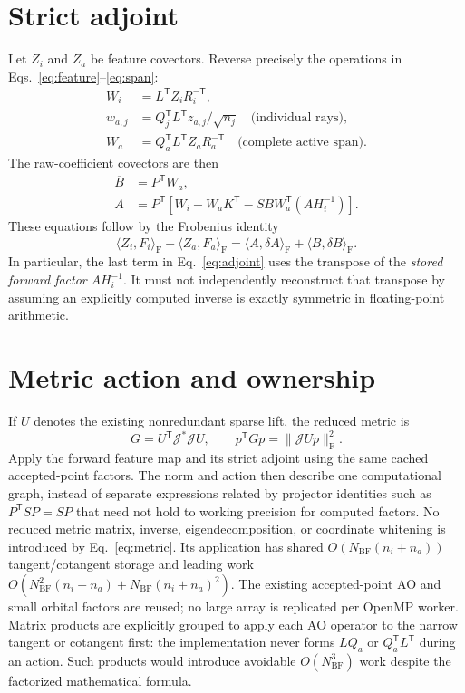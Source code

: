 \documentclass[11pt,a4paper]{article}
\newcommand{\Tr}{^{\mathsf T}}
\newcommand{\ip}[2]{\langle #1,#2\rangle_{\mathrm F}}
\begin{document}
\section{Strict adjoint}
Let $Z_i$ and $Z_a$ be feature covectors. Reverse precisely the operations in
Eqs.~\eqref{eq:feature}--\eqref{eq:span}:
\begin{align}
 W_i&=L\Tr Z_iR_i^{-\mathsf T},\\
 w_{a,j}&=Q_j\Tr L\Tr z_{a,j}/\sqrt{n_j}
 \quad\text{(individual rays)},\\
 W_a&=Q_a\Tr L\Tr Z_aR_a^{-\mathsf T}
 \quad\text{(complete active span)}.
\end{align}
The raw-coefficient covectors are then
\begin{align}
 \overline B&=P\Tr W_a,\\
 \overline A&=P\Tr\left[W_i-W_aK\Tr-SBW_a\Tr(AH_i^{-1})\right].
 \label{eq:adjoint}
\end{align}
These equations follow by the Frobenius identity
\begin{equation}
 \ip{Z_i}{F_i}+\ip{Z_a}{F_a}
 =\ip{\overline A}{\delta A}+\ip{\overline B}{\delta B}.
\end{equation}
In particular, the last term in Eq.~\eqref{eq:adjoint} uses the transpose of
the \emph{stored forward factor} $AH_i^{-1}$. It must not independently
reconstruct that transpose by assuming an explicitly computed inverse is
exactly symmetric in floating-point arithmetic.

\section{Metric action and ownership}
If $U$ denotes the existing nonredundant sparse lift, the reduced metric is
\begin{equation}
 G=U\Tr\mathcal J^*\mathcal JU,\qquad
 p\Tr Gp=\|\mathcal JU p\|_{\mathrm F}^2. \label{eq:metric}
\end{equation}
Apply the forward feature map and its strict adjoint using the same cached
accepted-point factors. The norm and action then describe one computational
graph, instead of separate expressions related by projector identities such
as $P\Tr SP=SP$ that need not hold to working precision for computed factors.
No reduced metric matrix, inverse, eigendecomposition, or coordinate
whitening is introduced by Eq.~\eqref{eq:metric}. Its application has shared
$O(N_{\mathrm{BF}}(n_i+n_a))$ tangent/cotangent storage and leading work
$O(N_{\mathrm{BF}}^2(n_i+n_a)+N_{\mathrm{BF}}(n_i+n_a)^2)$.
The existing accepted-point AO and small orbital factors are reused; no
large array is replicated per OpenMP worker.
Matrix products are explicitly grouped to apply each AO operator to the
narrow tangent or cotangent first: the implementation never forms $LQ_a$ or
$Q_a\Tr L\Tr$ during an action. Such products would introduce avoidable
$O(N_{\mathrm{BF}}^3)$ work despite the factorized mathematical formula.
\end{document}
